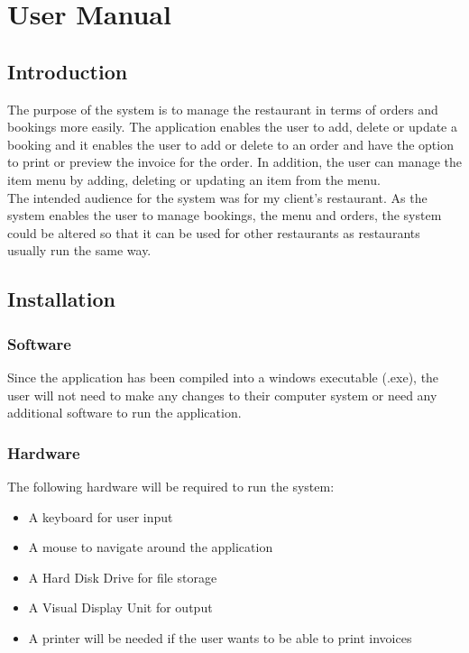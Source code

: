 \chapter{User Manual}

\section{Introduction}
The purpose of the system is to manage the restaurant in terms of orders and bookings more easily. The application enables the user to add, delete or update a booking and it enables the user to add or delete to an order and have the option to print or preview the invoice for the order. In addition, the user can manage the item menu by adding, deleting or updating an item from the menu. \\

The intended audience for the system was for my client's restaurant. As the system enables the user to manage bookings, the menu and orders, the system could be altered so that it can be used for other restaurants as restaurants usually run the same way.

\section{Installation}

\subsection{Software}
Since the application has been compiled into a windows executable (.exe), the user will not need to make any changes to their computer system or need any additional software to run the application.

\subsection{Hardware}

The following hardware will be required to run the system:

\begin{itemize}

	\item A keyboard for user input
	\item A mouse to navigate around the application
	\item A Hard Disk Drive for file storage 
	\item A Visual Display Unit for output
	\item A printer will be needed if the user wants to be able to print invoices
	

\end{itemize}


